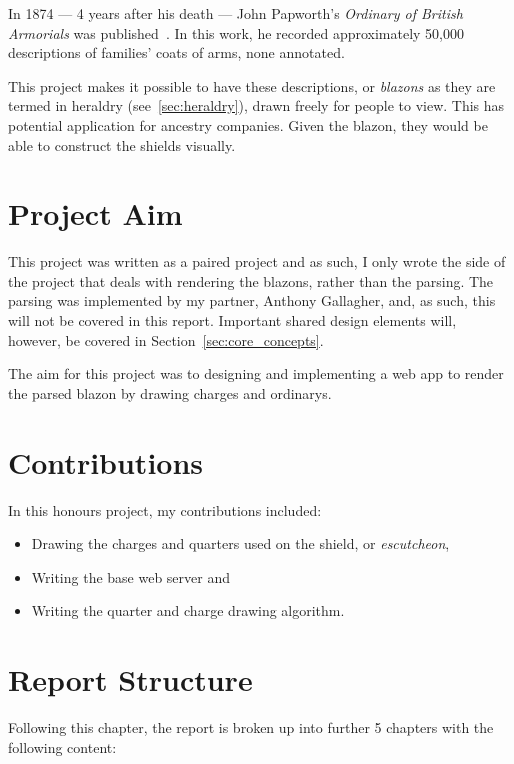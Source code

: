 \documentclass[nobib, a4paper, twoside, justified]{tufte-book}
\makeatletter
\newcommand{\charge}{\gls{charge}\@\xspace}
\newcommand{\charges}{\glspl{charge}\@\xspace}
\newcommand{\quarter}{\gls{quarter}\@\xspace}
\newcommand{\quarters}{\glspl{quarter}\@\xspace}
\newcommand{\blazon}{\gls{blazon}\@\xspace}
\newcommand{\blazons}{\glspl{blazon}\@\xspace}
\makeatother
\begin{document}
In 1874 --- 4 years after his death --- John Papworth's \textit{Ordinary of British Armorials} was
published~\autocite{collins_1942}. In this work, he recorded approximately 50,000 descriptions of
families' coats of arms, none annotated.

This project makes it possible to have these descriptions, or \textit{\blazons} as they are termed
in heraldry (see~\ref{sec:heraldry}), drawn freely for people to view. This has potential
application for ancestry companies. Given the \blazon, they would be able to construct the shields
visually.

\section{Project Aim}%
\label{sec:project_aim}

This project was written as a paired project and as such, I only wrote the side of the project that
deals with rendering the \blazons, rather than the parsing. The parsing was implemented by my
partner, Anthony Gallagher, and, as such, this will not be covered in this report. Important shared
design elements will, however, be covered in Section~\ref{sec:core_concepts}.

The aim for this project was to designing and implementing a web app to render the parsed \blazon
by drawing \charges and \glspl{ordinary}.

\section{Contributions}%
\label{sec:contributions}

In this honours project, my contributions included:

\begin{itemize}
  \item Drawing the \charges and \quarters used on the shield, or \textit{\gls{escutcheon}},
  \item Writing the base web server and
  \item Writing the \quarter and \charge drawing algorithm.
\end{itemize}

\section{Report Structure}%
\label{sec:report_structure}

Following this chapter, the report is broken up into further 5 chapters with the following content:
\end{document}
